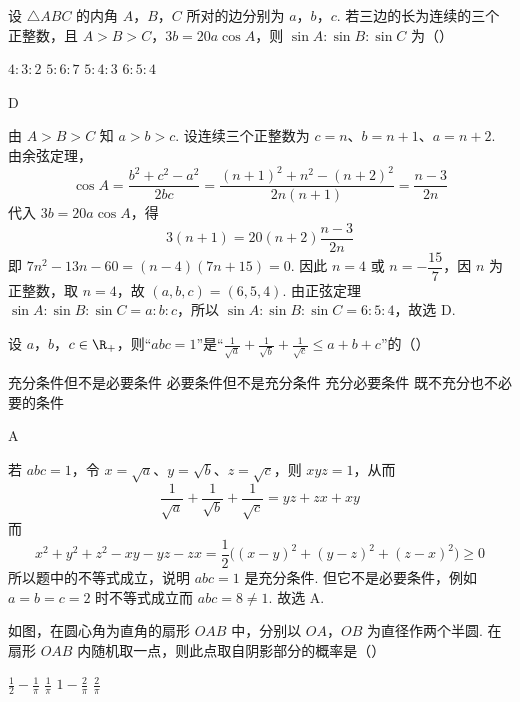 \begin{problem}
设 \(\triangle ABC\) 的内角 \(A\)，\(B\)，\(C\) 所对的边分别为 \(a\)，\(b\)，\(c\). 若三边的长为连续的三个正整数，且 \(A > B > C\)，\(3b = 20a\cos A\)，则 \(\sin A: \sin B: \sin C\) 为（\quad）

\choices
    {\(4:3:2\)}
    {\(5:6:7\)}
    {\(5:4:3\)}
    {\(6:5:4\)}
\end{problem}

\begin{answer}
D
\end{answer}

\begin{solution}
由 \(A>B>C\) 知 \(a>b>c\). 设连续三个正整数为 \(c=n\)、\(b=n+1\)、\(a=n+2\). 由余弦定理，
\[
\cos A=\frac{b^{2}+c^{2}-a^{2}}{2bc}=\frac{(n+1)^{2}+n^{2}-(n+2)^{2}}{2n(n+1)}=\frac{n-3}{2n}
\]
代入 \(3b=20a\cos A\)，得
\[
3(n+1)=20(n+2)\frac{n-3}{2n}
\]
即 \(7n^{2}-13n-60=(n-4)(7n+15)=0\). 因此 \(n=4\) 或 \(n=-\dfrac{15}{7}\)，因 \(n\) 为正整数，取 \(n=4\)，故 \((a,b,c)=(6,5,4)\). 由正弦定理 \(\sin A:\sin B:\sin C=a:b:c\)，所以 \(\sin A:\sin B:\sin C=6:5:4\)，故选 D.
\end{solution}

\begin{problem}
设 \(a\)，\(b\)，\(c \in \R_{+}\)，则“\(abc = 1\)”是“\(\frac{1}{\sqrt{a}} + \frac{1}{\sqrt{b}} + \frac{1}{\sqrt{c}} \leqslant a + b + c\)”的（\quad）

\choices
    {充分条件但不是必要条件}
    {必要条件但不是充分条件}
    {充分必要条件}
    {既不充分也不必要的条件}
\end{problem}

\begin{answer}
A
\end{answer}

\begin{solution}
若 \(abc=1\)，令 \(x=\sqrt a\)、\(y=\sqrt b\)、\(z=\sqrt c\)，则 \(xyz=1\)，从而
\[
\frac1{\sqrt a}+\frac1{\sqrt b}+\frac1{\sqrt c}=yz+zx+xy
\]
而
\[
x^{2}+y^{2}+z^{2}-xy-yz-zx
 =\frac12\bigl((x-y)^{2}+(y-z)^{2}+(z-x)^{2}\bigr)\geqslant0
\]
所以题中的不等式成立，说明 \(abc=1\) 是充分条件. 但它不是必要条件，例如 \(a=b=c=2\) 时不等式成立而 \(abc=8\neq1\). 故选 A.
\end{solution}

\begin{problem}
如图，在圆心角为直角的扇形 \(OAB\) 中，分别以 \(OA\)，\(OB\) 为直径作两个半圆. 在扇形 \(OAB\) 内随机取一点，则此点取自阴影部分的概率是（\quad）


\choices
    {\(\frac{1}{2} -\frac{1}{\pi}\)}
    {\(\frac{1}{\pi}\)}
    {\(1 - \frac{2}{\pi}\)}
    {\(\frac{2}{\pi}\)}
\end{problem}

